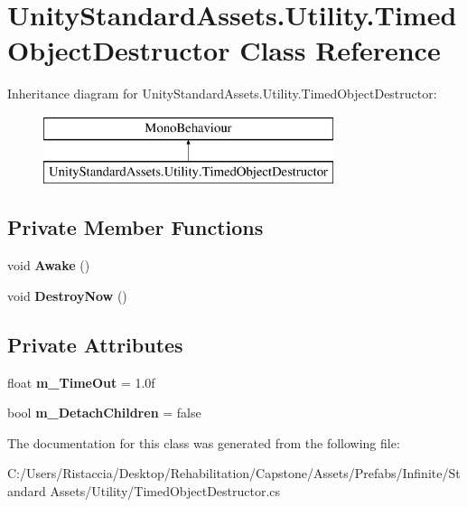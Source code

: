 \hypertarget{class_unity_standard_assets_1_1_utility_1_1_timed_object_destructor}{}\section{Unity\+Standard\+Assets.\+Utility.\+Timed\+Object\+Destructor Class Reference}
\label{class_unity_standard_assets_1_1_utility_1_1_timed_object_destructor}
Inheritance diagram for Unity\+Standard\+Assets.\+Utility.\+Timed\+Object\+Destructor\+:\begin{figure}[H]
\begin{center}
\leavevmode
\includegraphics[height=2.000000cm]{class_unity_standard_assets_1_1_utility_1_1_timed_object_destructor}
\end{center}
\end{figure}
\subsection*{Private Member Functions}
\begin{DoxyCompactItemize}
\item 
\mbox{\label{class_unity_standard_assets_1_1_utility_1_1_timed_object_destructor_a5ba763e4638d26e1633986885269dd03}} 
void {\bfseries Awake} ()
\item 
\mbox{\label{class_unity_standard_assets_1_1_utility_1_1_timed_object_destructor_a6c791fbd427b8cf06c1d65425c98aa77}} 
void {\bfseries Destroy\+Now} ()
\end{DoxyCompactItemize}
\subsection*{Private Attributes}
\begin{DoxyCompactItemize}
\item 
\mbox{\label{class_unity_standard_assets_1_1_utility_1_1_timed_object_destructor_afa9519153d48cc5299965ae404f3e076}} 
float {\bfseries m\+\_\+\+Time\+Out} = 1.\+0f
\item 
\mbox{\label{class_unity_standard_assets_1_1_utility_1_1_timed_object_destructor_ab413188ce9b61d64244811e70041c22e}} 
bool {\bfseries m\+\_\+\+Detach\+Children} = false
\end{DoxyCompactItemize}


The documentation for this class was generated from the following file\+:\begin{DoxyCompactItemize}
\item 
C\+:/\+Users/\+Ristaccia/\+Desktop/\+Rehabilitation/\+Capstone/\+Assets/\+Prefabs/\+Infinite/\+Standard Assets/\+Utility/Timed\+Object\+Destructor.\+cs\end{DoxyCompactItemize}
